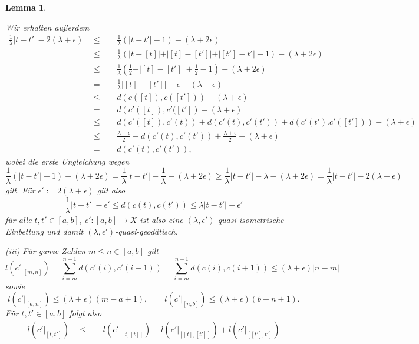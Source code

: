 \documentclass[11pt]{book}
\numberwithin{dummy}{section}
\newtheorem{lemma}[theorem]{Lemma}
\theoremstyle{nonumberbreak}
\newenvironment{pr}[1][]{\ifthenelse{\equal{#1}{}}{\proof}{\proof[#1]}\rm}{\endproof}
\newcommand{\la}{\longrightarrow}
\begin{document}
\begin{spacing}{1.4}
\begin{lemma}
\begin{pr}
\begin{compactenum}
Wir erhalten außerdem 
\begin{alignat*}{5}
\frac{1}{\lambda} \vert t-t'\vert  - 2(\lambda + \epsilon) \ \ &\leqslant&& \ \ \frac{1}{\lambda} \left( \vert t-t'\vert -1\right) - (\lambda + 2\epsilon) \\
&\leqslant&& \ \ \frac{1}{\lambda} \left( \vert t-[t]\vert + \vert [t]-[t']\vert + \vert [t']-t'\vert -1 \right) - (\lambda + 2 \epsilon) \\
&\leqslant&& \ \ \frac{1}{\lambda} \left( \frac{1}{2} + \vert [t]-[t'] \vert + \frac{1}{2} - 1 \right) - (\lambda + 2 \epsilon) \\
&=&& \ \ \frac{1}{\lambda} \vert [t]-[t'] \vert - \epsilon - (\lambda + \epsilon) \\
&\leqslant&& \ \ d \left( c([t]), c([t']) \right) - (\lambda + \epsilon) \\
&=&& \ \ d \left( c'([t]), c'([t']\right) - (\lambda + \epsilon) \\
&\leqslant&& \ \ d(c'([t]), c'(t)) + d(c'(t), c'(t')) + d(c'(t'). c'([t'])) - (\lambda + \epsilon) \\
&\leqslant&& \ \  \frac{\lambda + \epsilon}{2} + d(c'(t), c'(t')) + \frac{\lambda + \epsilon}{2} - (\lambda + \epsilon) \\
&=&& \ \ d \left( c'(t), c'(t')\right),
\end{alignat*}
wobei die erste Ungleichung wegen 
$$\frac{1}{\lambda} \left( \vert t-t'\vert -1\right) - (\lambda + 2 \epsilon) = \frac{1}{\lambda} \vert t-t'\vert - \frac{1}{\lambda} - (\lambda + 2\epsilon) \geqslant \frac{1}{\lambda} \vert t-t'\vert - \lambda - (\lambda + 2 \epsilon) = \frac{1}{\lambda} \vert t-t'\vert - 2(\lambda + \epsilon)$$
gilt. Für $\epsilon':= 2(\lambda+ \epsilon)$ gilt also 
$$\frac{1}{\lambda} \vert t-t'\vert - \epsilon' \leqslant d(c(t), c(t')) \leqslant \lambda \vert t-t'\vert + \epsilon'$$
für alle $t,t' \in [a,b]$, $c':[a,b]\la X$ ist also eine $(\lambda, \epsilon')$-quasi-isometrische Einbettung und damit $(\lambda, \epsilon')$-quasi-geodätisch.
\item[(iii)] Für ganze Zahlen $m\leqslant n \in [a,b]$ gilt
$$l\left( c'\vert_{[m,n]}\right) = \sum_{i=m}^{n-1} d\left( c'(i), c'(i+1)\right) = \sum_{i=m}^{n-1} d\left( c(i), c(i+1)\right) \leqslant (\lambda + \epsilon) \vert n-m\vert$$
sowie 
$$l\left( c'\vert_{[a,n]}\right) \leqslant (\lambda + \epsilon)(m-a+1), \qquad l\left( c'\vert_{[n,b]}\right) \leqslant (\lambda + \epsilon) (b-n+1).$$
Für $t,t' \in [a,b]$ folgt also 
\begin{alignat*}{5}
l\left( c'\vert_{[t,t']}\right) \ \ &\leqslant&& \ \ l \left( c'\vert_{[t,[t]]}\right) + l \left( c'\vert_{[[t],[t']]}\right) + l\left( c'\vert_{[[t'],t']}\right) \\

\end{alignat*}
\end{compactenum}
\end{pr}
\end{lemma}
\end{spacing}
\end{document}
